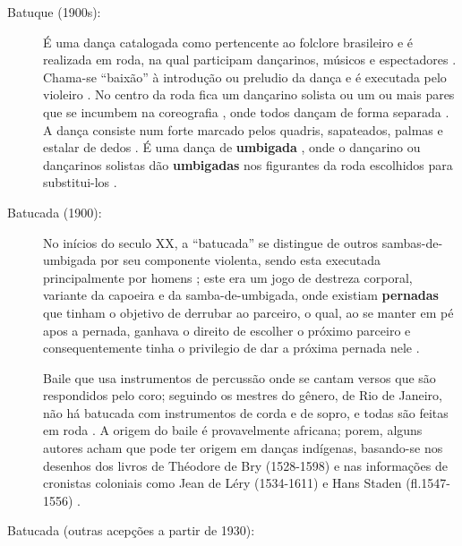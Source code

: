 \begin{description}
\item [Batuque (1900s):]
\label{ref:batuquedanca}
É uma dança catalogada como pertencente ao folclore brasileiro  \cite[pp. 96]{sandroni2001feitico} e
é realizada em roda, na qual participam dançarinos, músicos e espectadores \cite[pp. 89]{marcondes1977enciclopedia}.
Chama-se ``baixão'' à introdução ou preludio da dança  e é executada pelo violeiro  \cite[pp. 89]{marcondes1977enciclopedia}.
No centro da roda fica um dançarino solista ou um ou mais pares
que se incumbem na coreografia \cite[pp. 89]{marcondes1977enciclopedia},
onde todos dançam de forma separada \cite[pp. 65]{sandroni2001feitico}.
A dança consiste num forte marcado pelos quadris, sapateados, palmas e estalar de dedos  \cite[pp. 89]{marcondes1977enciclopedia}.
É uma dança de \textbf{umbigada} \cite[pp. 96]{sandroni2001feitico} \cite[pp. 89]{marcondes1977enciclopedia}, 
onde o dançarino ou dançarinos solistas
dão \textbf{umbigadas} nos figurantes da roda  escolhidos para substitui-los \cite[pp. 89]{marcondes1977enciclopedia}.



\item [Batucada (1900):]
\label{ref:batucadadanca}
No inícios do seculo XX,
a ``batucada'' se distingue de outros sambas-de-umbigada por seu componente violenta, 
sendo esta executada principalmente por homens \cite[pp. 8]{reffolclorebatucadajornal} \cite[pp. 103]{sandroni2001feitico};
este era um jogo de destreza corporal, variante da capoeira e da samba-de-umbigada,
onde existiam \textbf{pernadas} que tinham o objetivo de derrubar ao parceiro, o qual, ao se manter em pé apos a pernada,
ganhava o direito de escolher o próximo parceiro
 e consequentemente tinha o privilegio de dar a próxima pernada nele \cite[pp. 103]{sandroni2001feitico}.

Baile que usa instrumentos de percussão onde se cantam versos que são respondidos pelo coro;
seguindo os mestres do gênero, de Rio de Janeiro, 
não há batucada com instrumentos de corda e de sopro, 
e  todas são feitas em roda \cite[pp. 89]{marcondes1977enciclopedia}.
A origem do baile é provavelmente africana; porem, alguns autores acham que pode ter origem em  danças indígenas,
basando-se nos desenhos dos livros de Théodore de Bry (1528-1598) e
nas informações de cronistas coloniais como Jean de Léry (1534-1611) e
Hans Staden (fl.1547-1556) \cite[pp. 89]{marcondes1977enciclopedia}.


\item [Batucada (outras acepções a partir de 1930):]
\label{ref:batucadadanca1930}


\end{description}
